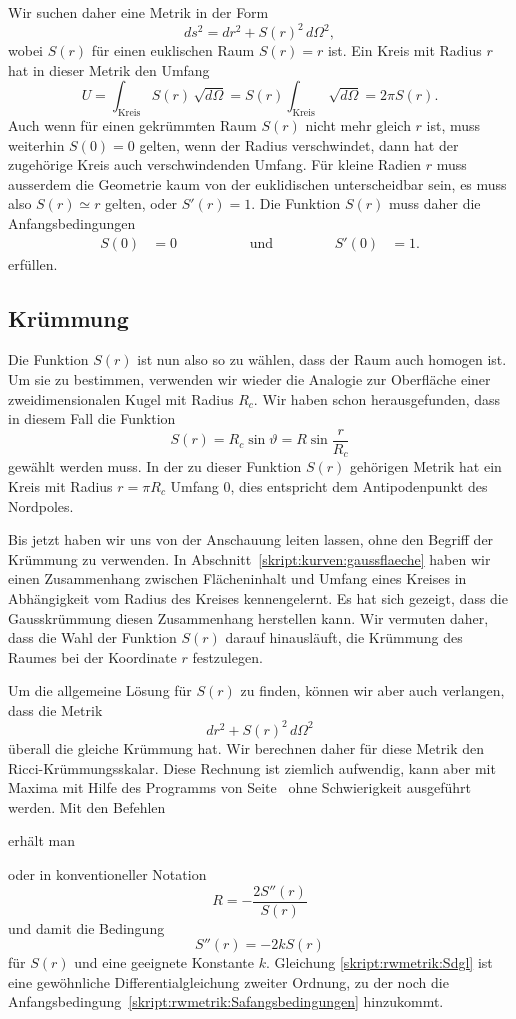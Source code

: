 Wir suchen daher eine Metrik in der Form
\[
ds^2 
=
dr^2 + S(r)^2 \,d\Omega^2,
\]
wobei $S(r)$ für einen euklischen Raum $S(r)=r$ ist.
Ein Kreis mit Radius $r$ hat in dieser Metrik den Umfang
\[
U
=
\int_{\textrm{Kreis}} S(r)\,\sqrt{d\Omega}
=
S(r)\int_{\textrm{Kreis}} \,\sqrt{d\Omega}
=
2\pi S(r).
\]
Auch wenn für einen gekrümmten Raum $S(r)$ nicht mehr gleich $r$ ist,
muss weiterhin $S(0)=0$ gelten, wenn der Radius verschwindet, dann
hat der zugehörige Kreis auch verschwindenden Umfang.
Für kleine Radien $r$ muss ausserdem die Geometrie kaum von der
euklidischen unterscheidbar sein, es muss also $S(r)\simeq r$ gelten,
oder $S'(r)=1$.
Die Funktion $S(r)$ muss daher die Anfangsbedingungen
\begin{equation}
\begin{aligned}
S(0)&=0&&\qquad&&\text{und}&&\qquad&S'(0)&=1.
\end{aligned}
\label{skript:rwmetrik:Safangsbedingungen}
\end{equation}
erfüllen.

\subsection{Krümmung}
Die Funktion $S(r)$ ist nun also so zu wählen, dass der Raum auch
homogen ist.
Um sie zu bestimmen, verwenden wir wieder die Analogie zur Oberfläche
einer zweidimensionalen Kugel mit Radius $R_c$.
Wir haben schon herausgefunden, dass in diesem Fall die Funktion 
\[
S(r) = R_c\sin\vartheta=R\sin\frac{r}{R_c}
\]
gewählt werden muss.
In der zu dieser Funktion $S(r)$ gehörigen Metrik hat ein Kreis mit 
Radius $r=\pi R_c$ Umfang $0$, dies entspricht dem Antipodenpunkt des
Nordpoles.

Bis jetzt haben wir uns von der Anschauung leiten lassen, ohne den
Begriff der Krümmung zu verwenden.
In Abschnitt~\ref{skript:kurven:gaussflaeche} haben wir 
einen Zusammenhang zwischen Flächeninhalt und Umfang eines Kreises
in Abhängigkeit vom Radius des Kreises kennengelernt.
Es hat sich gezeigt, dass die Gausskrümmung diesen Zusammenhang herstellen
kann.
Wir vermuten daher, dass die Wahl der Funktion $S(r)$ darauf hinausläuft,
die Krümmung des Raumes bei der Koordinate $r$ festzulegen.

Um die allgemeine Lösung für $S(r)$ zu finden, können wir
aber auch verlangen, dass die Metrik
\[
dr^2 + S(r)^2\,d\Omega^2
\]
überall die gleiche Krümmung hat.
Wir berechnen daher für diese Metrik den Ricci-Krümmungs\-ska\-lar.
Diese Rechnung ist ziemlich aufwendig, kann aber mit Maxima
mit Hilfe des Programms von Seite~\pageref{skript:maxima:curvature}
ohne Schwierigkeit ausgeführt werden.
Mit den Befehlen

erhält man

oder in konventioneller Notation
\[
R=
-\frac{2S''(r)}{S(r)}
\]
und damit die Bedingung
\begin{equation}
S''(r)=-2k S(r)
\label{skript:rwmetrik:Sdgl}
\end{equation}
für $S(r)$ und eine geeignete Konstante $k$.
Gleichung \eqref{skript:rwmetrik:Sdgl} ist eine gewöhnliche
Differentialgleichung zweiter Ordnung, zu der noch die
Anfangsbedingung~\eqref{skript:rwmetrik:Safangsbedingungen}
hinzukommt.

